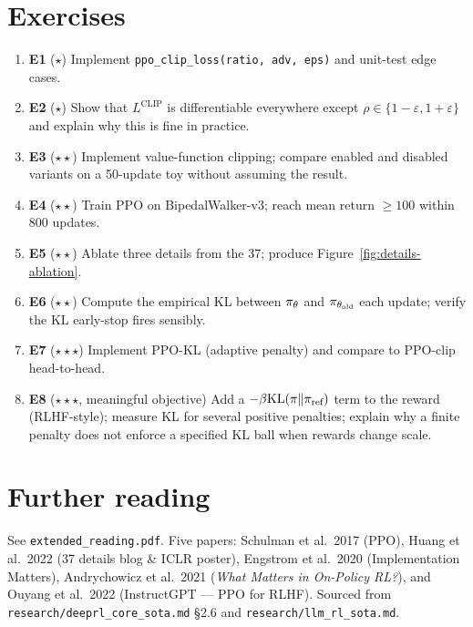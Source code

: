 \documentclass[11pt,oneside]{scrbook}
\begin{document}
\chapter{Exercises}

\begin{enumerate}[label={},leftmargin=0pt,labelsep=0pt]
  \item \textbf{E1} ($\star$) Implement \texttt{ppo\_clip\_loss(ratio, adv, eps)} and unit-test edge cases.
  \item \textbf{E2} ($\star$) Show that $L^{\mathrm{CLIP}}$ is differentiable everywhere except $\rho \in \{1-\varepsilon, 1+\varepsilon\}$ and explain why this is fine in practice.
  \item \textbf{E3} ($\star\star$) Implement value-function clipping; compare enabled and disabled variants on a 50-update toy without assuming the result.
  \item \textbf{E4} ($\star\star$) Train PPO on BipedalWalker-v3; reach mean return $\ge 100$ within 800 updates.
  \item \textbf{E5} ($\star\star$) Ablate three details from the 37; produce Figure~\ref{fig:details-ablation}.
  \item \textbf{E6} ($\star\star$) Compute the empirical KL between $\pi_\theta$ and $\pi_{\theta_\text{old}}$ each update; verify the KL early-stop fires sensibly.
  \item \textbf{E7} ($\star\star\star$) Implement PPO-KL (adaptive penalty) and compare to PPO-clip head-to-head.
  \item \textbf{E8} ($\star\star\star$, meaningful objective) Add a $-\beta \mathrm{KL}(\pi\|\pi_\text{ref})$ term to the reward (RLHF-style); measure KL for several positive penalties; explain why a finite penalty
does not enforce a specified KL ball when rewards change scale.
\end{enumerate}

\chapter{Further reading}

See \texttt{extended\_reading.pdf}. Five papers: Schulman et al.\ 2017 (PPO), Huang et al.\ 2022 (37 details blog \& ICLR poster), Engstrom et al.\ 2020 (Implementation Matters), Andrychowicz et al.\ 2021 (\emph{What Matters in On-Policy RL?}), and Ouyang et al.\ 2022 (InstructGPT --- PPO for RLHF). Sourced from \texttt{research/deeprl\_core\_sota.md} \S 2.6 and \texttt{research/llm\_rl\_sota.md}.
\end{document}

